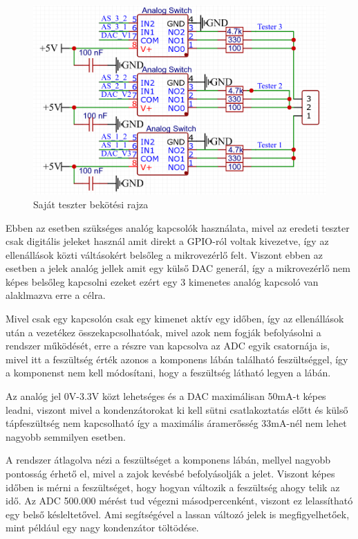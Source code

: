 \begin{figure}[H]
    \centering
    \includegraphics[scale=0.3]{figures/images/literature/TeszterConnections.png}
    \caption{Saját teszter bekötési rajza}
    \label{fig:ownTesterConnection}
\end{figure}

Ebben az esetben szükséges analóg kapcsolók használata, mivel az eredeti
teszter csak digitális jeleket használ amit direkt a GPIO-ról voltak kivezetve,
így az ellenállások közti váltásokért belsőleg a mikrovezérlő felt. Viszont ebben
az esetben a jelek analóg jellek amit egy külső DAC generál, így a mikrovezérlő nem
képes belsőleg kapcsolni ezeket ezért egy 3 kimenetes analóg kapcsoló van alaklmazva
erre a célra.

Mivel csak egy kapcsolón csak egy kimenet aktív egy időben, így az ellenállások után
a vezetékez összekapcsolhatóak, mivel azok nem fogják befolyásolni a rendszer működését,
erre a részre van kapcsolva az ADC egyik csatornája is, mivel itt a feszültség érték
azonos a komponens lábán található feszültséggel, így a komponenst nem kell módosítani,
hogy a feszültség látható legyen a lábán.

Az analóg jel 0V-3.3V közt lehetséges és a DAC maximálisan 50mA-t képes leadni, viszont
mivel a kondenzátorokat ki kell sütni csatlakoztatás előtt és külső tápfeszültség nem 
kapcsolható így a maximális áramerősség 33mA-nél nem lehet nagyobb semmilyen esetben.

A rendszer átlagolva nézi a feszültséget a komponens lábán, mellyel nagyobb pontosság
érhető el, mivel a zajok kevésbé befolyásolják a jelet. Viszont képes időben is mérni
a feszültséget, hogy hogyan változik a feszültség ahogy telik az idő. Az ADC 500.000 mérést
tud végezni másodpercenként, viszont ez lelassítható egy belső késleltetővel. Ami segítségével
a lassan változó jelek is megfigyelhetőek, mint például egy nagy kondenzátor töltödése.

